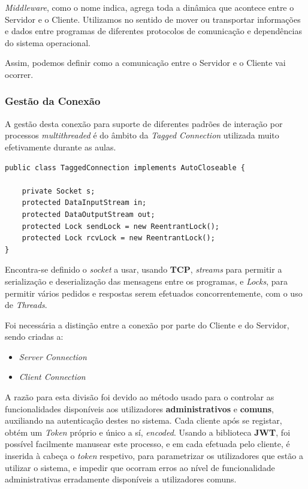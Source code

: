 \documentclass[relatorio.tex]{subfiles}
\begin{document}
\textit{Middleware}, como o nome indica, agrega toda a dinâmica que acontece entre o Servidor e o Cliente.
Utilizamos no sentido de mover ou transportar informações e dados entre programas de diferentes 
protocolos de comunicação e dependências do sistema operacional.

Assim, podemos definir como a comunicação entre o Servidor e o Cliente vai ocorrer.

\subsubsection{Gestão da Conexão}

A gestão desta conexão para suporte de diferentes padrões de interação por processos \textit{multithreaded}
é do âmbito da \textit{Tagged Connection} utilizada muito efetivamente durante as aulas.

\begin{verbatim}
public class TaggedConnection implements AutoCloseable {

    private Socket s;
	protected DataInputStream in;
	protected DataOutputStream out;
	protected Lock sendLock = new ReentrantLock();
	protected Lock rcvLock = new ReentrantLock();
}
\end{verbatim}

Encontra-se definido o \textit{socket} a usar, usando \textbf{TCP}, \textit{streams} para permitir a
serialização e deserialização das mensagens entre os programas, e \textit{Locks}, para permitir vários 
pedidos e respostas serem efetuados concorrentemente, com o uso de \textit{Threads}.

Foi necessária a distinção entre a conexão por parte do Cliente e do Servidor, sendo criadas a:
\begin{itemize}
    \item \textit{Server Connection}
    \item \textit{Client Connection}
\end{itemize}

A razão para esta divisão foi devido ao método usado para o controlar as funcionalidades 
disponíveis aos utilizadores \textbf{administrativos} e \textbf{comuns}, auxiliando na autenticação
destes no sistema.
Cada cliente após se registar, obtém um \textit{Token} próprio e único a sí, \textit{encoded}.
Usando a biblioteca \textbf{JWT}, foi possível facilmente manusear este processo, e em cada 
efetuada pelo cliente, é inserida à cabeça o \textit{token} respetivo, para parametrizar
os utilizadores que estão a utilizar o sistema, e impedir que ocorram erros ao nível de 
funcionalidade administrativas erradamente disponíveis a utilizadores comuns.
\end{document}

